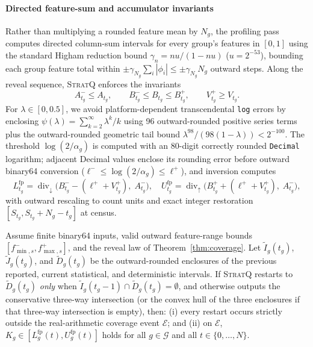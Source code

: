 \paragraph{Directed feature-sum and accumulator invariants}
Rather than multiplying a rounded feature mean by $N_g$, the profiling pass computes directed column-sum intervals for every group's features in $[0, 1]$ using the standard Higham reduction bound $\gamma_n = n u / (1 - n u)$ ($u = 2^{-53}$), bounding each group feature total within $\pm \gamma_{N_g}\sum_i|\phi_i| \le \pm\gamma_{N_g}N_g$ outward steps.
Along the reveal sequence, \textsc{StratQ} enforces the invariants
\begin{equation}
  A_{t_g}^- \le A_{t_g}, \qquad B_{t_g}^- \le B_{t_g} \le B_{t_g}^+, \qquad V_{t_g}^+ \ge V_{t_g}.
  \label{eq:fp-inv}
\end{equation}
For $\lambda \in [0, 0.5]$, we avoid platform-dependent transcendental \texttt{log} errors by enclosing $\psi(\lambda) = \sum_{k=2}^\infty \lambda^k/k$ using 96 outward-rounded positive series terms plus the outward-rounded geometric tail bound $\lambda^{98}/(98(1-\lambda)) < 2^{-100}$.
The threshold $\log(2/\alpha_g)$ is computed with an 80-digit correctly rounded \texttt{Decimal} logarithm; adjacent Decimal values enclose its rounding error before outward binary64 conversion ($\ell^- \le \log(2/\alpha_g) \le \ell^+$), and inversion computes
\begin{equation}
  L_{t_g}^{\text{fp}} = \operatorname{div}_\downarrow\!\bigl(B_{t_g}^- - (\ell^+ + V_{t_g}^+),\; A_{t_g}^-\bigr), \quad
  U_{t_g}^{\text{fp}} = \operatorname{div}_\uparrow\!\bigl(B_{t_g}^+ + (\ell^+ + V_{t_g}^+),\; A_{t_g}^-\bigr),
\end{equation}
with outward rescaling to count units and exact integer restoration $[S_{t_g}, S_{t_g} + N_g - t_g]$ at census.

\begin{theorem}
\label{thm:fp}
Assume finite binary64 inputs, valid outward feature-range bounds $[f_{\min,s}^-, f_{\max,s}^+]$, and the reveal law of Theorem~\ref{thm:coverage}. Let $\tilde{I}_g(t_g)$, $\tilde{J}_g(t_g)$, and $\tilde{D}_g(t_g)$ be the outward-rounded enclosures of the previous reported, current statistical, and deterministic intervals.
If \textsc{StratQ} restarts to $\tilde{D}_g(t_g)$ \emph{only} when $\tilde{I}_g(t_g-1) \cap \tilde{D}_g(t_g) = \emptyset$, and otherwise outputs the conservative three-way intersection (or the convex hull of the three enclosures if that three-way intersection is empty), then: (i) every restart occurs strictly outside the real-arithmetic coverage event $\mathcal{E}$; and (ii) on $\mathcal{E}$, $K_g \in [L_g^{\text{fp}}(t), U_g^{\text{fp}}(t)]$ holds for all $g \in \mathcal{G}$ and all $t \in \{0,\dots,N\}$.
\end{theorem}

